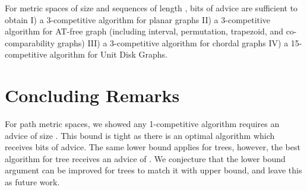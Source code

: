 \begin{coro}
For metric spaces of size  and sequences of length ,  bits of advice are sufficient to obtain I) a 3-competitive algorithm for planar graphs 
II) a 3-competitive algorithm for AT-free graph (including interval, permutation, trapezoid, and co-comparability graphs)
III) a 3-competitive algorithm for chordal graphs 
IV) a 15-competitive algorithm for Unit Disk Graphs.
\end{coro}

\section*{Concluding Remarks}
For path metric spaces, we showed any 1-competitive algorithm requires an advice of size . This bound is tight as there is an optimal algorithm \cite{WAOA11} which receives  bits of advice.
The same lower bound applies for trees, however, the best algorithm for tree receives an advice of . We conjecture that the lower bound argument can be improved for trees to match it with upper bound, and leave this as future work.

